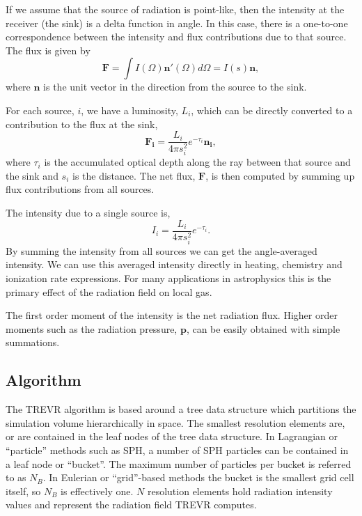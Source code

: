 \documentclass[fleq,usenatbib]{mnras}
\newcommand{\acro}{TREVR}
\begin{document}
{If we assume that the source of radiation is point-like, then the intensity at 
the receiver (the sink) is a delta function in angle. In this case, there is a 
one-to-one correspondence between the intensity and flux contributions due to 
that source. The flux is given by 
\begin{equation}
  \mathbf{F} = \int I(\Omega) \mathbf{n'}(\Omega) d\Omega = I(s) \mathbf{n},
\end{equation}
where $\mathbf{n}$ is the unit vector in the direction from the source to the 
sink.

For each source, $i$, we have a luminosity, $L_i$, which can be directly 
converted to a contribution to the flux at the sink,
\begin{equation}
\label{eqn:simpflux}
\mathbf{F_i} = \frac{L_i}{4\pi s_i^2} e^{-\tau_i} \mathbf{n_i},
\end{equation}
where $\tau_i$ is the accumulated optical depth along the ray between that 
source and the sink and $s_i$ is the distance. The net flux, $\mathbf{F}$, is 
then computed by summing up flux contributions from all sources.

The intensity due to a single source is,
\begin{equation}
\label{eqn:simpint}
I_i = \frac{L_i}{4\pi s_i^2} e^{-\tau_i}.
\end{equation}
By summing the intensity from all sources we can get the angle-averaged 
intensity. We can use this averaged intensity directly in heating, chemistry 
and ionization rate expressions. For many applications in astrophysics this is 
the primary effect of the radiation field on local gas.

The first order moment of the intensity is the net radiation flux.  Higher 
order moments such as the radiation pressure, $\mathbf{p}$, can be easily 
obtained with simple summations.

\subsection{Algorithm}\label{sec:algo}
The \acro{} algorithm is based around a tree data structure which partitions 
the simulation volume hierarchically in space. The smallest resolution 
elements are, or are contained in the leaf nodes of the tree data 
structure. In Lagrangian or ``particle'' methods such as SPH, a number of SPH 
particles can be contained in a leaf node or ``bucket''. The maximum number of 
particles per bucket is referred to as $N_B$. In Eulerian or ``grid''-based 
methods the bucket is the smallest grid cell itself, so $N_B$ is effectively 
one. $N$ resolution elements hold radiation intensity values and represent the 
radiation field \acro{} computes. 

}
\end{document}
